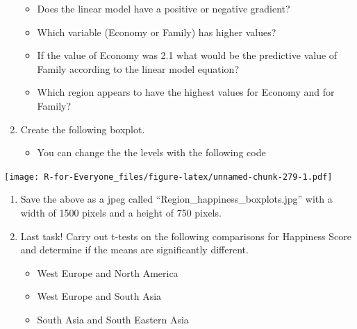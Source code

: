 \documentclass[]{book}
\newenvironment{Shaded}{\begin{snugshade}}{\end{snugshade}}
\newcommand{\KeywordTok}[1]{\textcolor[rgb]{0.13,0.29,0.53}{\textbf{#1}}}
\newcommand{\StringTok}[1]{\textcolor[rgb]{0.31,0.60,0.02}{#1}}
\newcommand{\OperatorTok}[1]{\textcolor[rgb]{0.81,0.36,0.00}{\textbf{#1}}}
\newcommand{\NormalTok}[1]{#1}
\providecommand{\tightlist}{%
  \setlength{\itemsep}{0pt}\setlength{\parskip}{0pt}}
\begin{document}
\begin{enumerate}
  \begin{itemize}
  \tightlist
  \item
    Does the linear model have a positive or negative gradient?
  \item
    Which variable (Economy or Family) has higher values?
  \item
    If the value of Economy was 2.1 what would be the predictive value
    of Family according to the linear model equation?
  \item
    Which region appears to have the highest values for Economy and for
    Family?
  \end{itemize}
\item
  Create the following boxplot.

  \begin{itemize}
  \tightlist
  \item
    You can change the the levels with the following code
  \end{itemize}
\end{enumerate}

\begin{Shaded}
\end{Shaded}

\texttt{[image: R-for-Everyone\_files/figure-latex/unnamed-chunk-279-1.pdf]}

\begin{enumerate}
\def\labelenumi{\arabic{enumi}.}
\setcounter{enumi}{6}
\item
  Save the above as a jpeg called ``Region\_happiness\_boxplots.jpg''
  with a width of 1500 pixels and a height of 750 pixels.
\item
  Last task! Carry out t-tests on the following comparisons for
  Happiness Score and determine if the means are significantly
  different.

  \begin{itemize}
  \tightlist
  \item
    West Europe and North America
  \item
    West Europe and South Asia
  \item
    South Asia and South Eastern Asia
  \end{itemize}
\end{enumerate}
\end{document}
